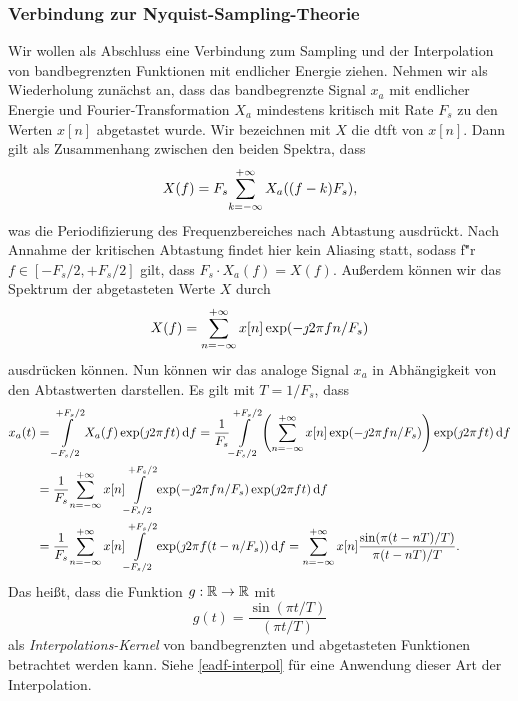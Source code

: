 \subsubsection{Verbindung zur Nyquist-Sampling-Theorie}
%
%
Wir wollen als Abschluss eine Verbindung zum Sampling und der Interpolation~\cite[Kapitel~6.1]{proakis2013} von bandbegrenzten Funktionen mit endlicher Energie ziehen. Nehmen wir als Wiederholung zun\"achst an, dass das bandbegrenzte Signal $x_a$ mit endlicher Energie und Fourier-Transformation $X_a$ mindestens kritisch mit Rate $F_s$ zu den Werten $x[n]$ abgetastet wurde. Wir bezeichnen mit $X$ die \gls{dtft} von $x[n]$. Dann gilt als Zusammenhang zwischen den beiden Spektra, dass
\begin{equation}
    X(f) = F_s {\sum\limits_{k=-\infty}^{+\infty}{
        X_a((f - k) F_s)
    }} ,
\end{equation}
was die Periodifizierung des Frequenzbereiches nach Abtastung ausdr\"uckt. Nach Annahme der kritischen Abtastung findet hier kein Aliasing statt, sodass f\u"r $f \in [-F_s/2,+F_s/2]$ gilt, dass $F_s \cdot X_a(f) = X(f)$. Au{\ss}erdem k\"onnen wir das Spektrum der abgetasteten Werte $X$ durch
\begin{equation}
    X(f) = {\sum\limits_{n=-\infty}^{+\infty}{x[n] \exp(- \jmath 2 \pi f n / F_s)}}
\end{equation}
ausdr\"ucken k\"onnen. Nun k\"onnen wir das analoge Signal $x_a$ in Abh\"angigkeit von den Abtastwerten darstellen. Es gilt mit $T = 1/F_s$, dass
\begin{align*}
    x_a(t) &= {\int\limits_{-F_s/2}^{+F_s/2}{
        X_a(f) \exp(\jmath 2 \pi f t)
    }\,\mathrm{d}{f}} = \frac{1}{F_s} {\int\limits_{-F_s/2}^{+F_s/2}{
        \left(
            {\sum\limits_{n=-\infty}^{+\infty}{x[n] \exp(- \jmath 2 \pi f n / F_s)}}
        \right) \exp(\jmath 2 \pi f t)
    }\,\mathrm{d}{f}} \\
    &= \frac{1}{F_s} 
        {\sum\limits_{n=-\infty}^{+\infty}{
            x[n] {\int\limits_{-F_s/2}^{+F_s/2}{\exp(- \jmath 2 \pi f n / F_s) \exp(\jmath 2 \pi f t)}\,\mathrm{d}{f}}
        }} \\
    &= \frac{1}{F_s} 
    {\sum\limits_{n=-\infty}^{+\infty}{
        x[n] {\int\limits_{-F_s/2}^{+F_s/2}{\exp(\jmath 2 \pi f (t - n/F_s))}\,\mathrm{d}{f}}
    }} 
    = {\sum\limits_{n=-\infty}^{+\infty}{
        x[n] \frac{\sin(\pi(t-nT)/T)}{\pi(t-nT)/T}
    }}.
\end{align*}
Das hei{\ss}t, dass die Funktion $g: \mathbb{R} \rightarrow \mathbb{R}$ mit
\begin{equation}\label{bsplines_sinckernel}
    g(t) = \frac{\sin(\pi t / T)}{(\pi t/T)}
\end{equation}
als \emph{Interpolations-Kernel} von bandbegrenzten und abgetasteten Funktionen betrachtet werden kann. Siehe \cref{eadf-interpol} f\"ur eine Anwendung dieser Art der Interpolation.

